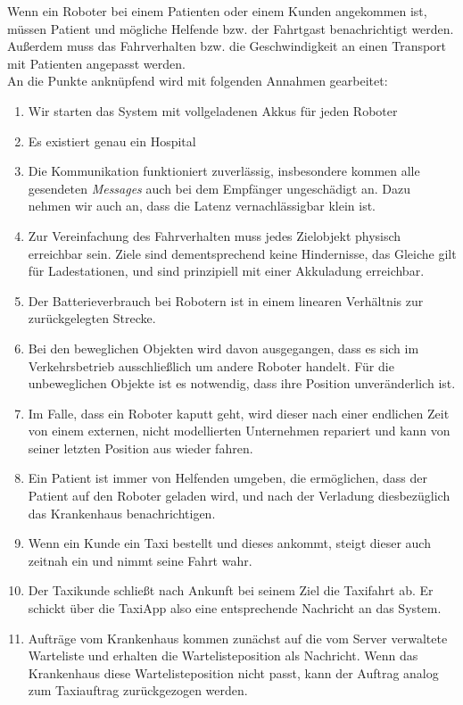 Wenn ein Roboter bei einem Patienten oder einem Kunden angekommen ist, müssen Patient und mögliche Helfende bzw. der Fahrtgast benachrichtigt werden. Außerdem muss das Fahrverhalten bzw. die Geschwindigkeit an einen Transport mit Patienten angepasst werden.\\

An die Punkte anknüpfend wird mit folgenden Annahmen gearbeitet:
\begin{enumerate}
	\item Wir starten das System mit vollgeladenen Akkus für jeden Roboter
	\item Es existiert genau ein Hospital
	\item Die Kommunikation funktioniert zuverlässig, insbesondere kommen alle gesendeten \textit{Messages} auch bei dem Empfänger ungeschädigt an. Dazu nehmen wir auch an, dass die Latenz vernachlässigbar klein ist.
	\item Zur Vereinfachung des Fahrverhalten muss jedes Zielobjekt physisch erreichbar sein. Ziele sind dementsprechend keine Hindernisse, das Gleiche gilt für Ladestationen, und sind prinzipiell mit einer Akkuladung erreichbar.
	\item Der Batterieverbrauch bei Robotern ist in einem linearen Verhältnis zur zurückgelegten Strecke.
	\item Bei den beweglichen Objekten wird davon ausgegangen, dass es sich im Verkehrsbetrieb ausschließlich um andere Roboter handelt. 
	Für die unbeweglichen Objekte ist es notwendig, dass ihre Position unveränderlich ist.
	\item Im Falle, dass ein Roboter kaputt geht, wird dieser nach einer endlichen Zeit von einem externen, nicht modellierten Unternehmen repariert und kann von seiner letzten Position aus wieder fahren.
	\item Ein Patient ist immer von Helfenden umgeben, die ermöglichen, dass der Patient auf den Roboter geladen wird, und nach der Verladung diesbezüglich das Krankenhaus benachrichtigen.
	\item Wenn ein Kunde ein Taxi bestellt und dieses ankommt, steigt dieser auch zeitnah ein und nimmt seine Fahrt wahr.
	\item Der Taxikunde schließt nach Ankunft bei seinem Ziel die Taxifahrt ab. Er schickt über die TaxiApp also eine entsprechende Nachricht an das System.
	\item Aufträge vom Krankenhaus kommen zunächst auf die vom Server verwaltete Warteliste und erhalten die Wartelisteposition als Nachricht. Wenn das Krankenhaus diese Wartelisteposition nicht passt, kann der Auftrag analog zum Taxiauftrag zurückgezogen werden.

\end{enumerate}

